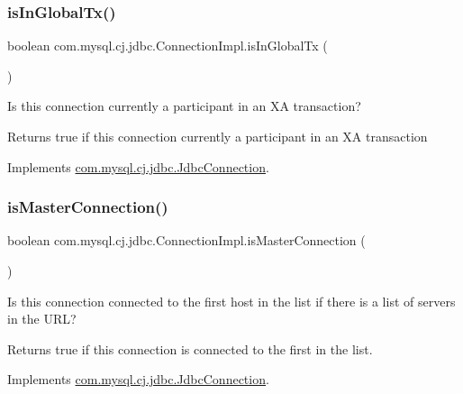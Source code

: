 \subsubsection{\texorpdfstring{is\+In\+Global\+Tx()}{isInGlobalTx()}}
{\footnotesize\ttfamily boolean com.\+mysql.\+cj.\+jdbc.\+Connection\+Impl.\+is\+In\+Global\+Tx (\begin{DoxyParamCaption}{ }\end{DoxyParamCaption})}

Is this connection currently a participant in an XA transaction?

\begin{DoxyReturn}{Returns}
true if this connection currently a participant in an XA transaction 
\end{DoxyReturn}


Implements \mbox{\hyperlink{interfacecom_1_1mysql_1_1cj_1_1jdbc_1_1_jdbc_connection_a919152df37a4bf60c12c0818256a90a3}{com.\+mysql.\+cj.\+jdbc.\+Jdbc\+Connection}}.

\mbox{\label{classcom_1_1mysql_1_1cj_1_1jdbc_1_1_connection_impl_a5ba146293ff6812bf52d5baf61f66e02}} 
\subsubsection{\texorpdfstring{is\+Master\+Connection()}{isMasterConnection()}}
{\footnotesize\ttfamily boolean com.\+mysql.\+cj.\+jdbc.\+Connection\+Impl.\+is\+Master\+Connection (\begin{DoxyParamCaption}{ }\end{DoxyParamCaption})}

Is this connection connected to the first host in the list if there is a list of servers in the U\+RL?

\begin{DoxyReturn}{Returns}
true if this connection is connected to the first in the list. 
\end{DoxyReturn}


Implements \mbox{\hyperlink{interfacecom_1_1mysql_1_1cj_1_1jdbc_1_1_jdbc_connection_a012dc133872dd4d6db6d6f98118d3251}{com.\+mysql.\+cj.\+jdbc.\+Jdbc\+Connection}}.

